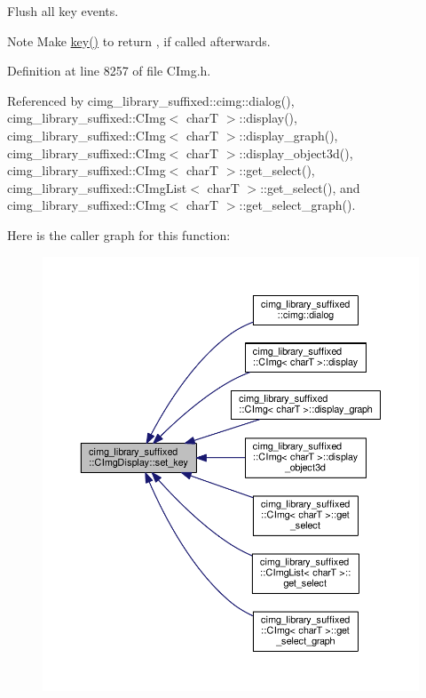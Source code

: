 Flush all key events. 

\begin{DoxyNote}{Note}
Make \hyperlink{structcimg__library__suffixed_1_1CImgDisplay_a8eb7cd4bd6e6593689f82d157caf3ec1}{key()} to return {}, if called afterwards. 
\end{DoxyNote}


Definition at line 8257 of file C\+Img.\+h.



Referenced by cimg\+\_\+library\+\_\+suffixed\+::cimg\+::dialog(), cimg\+\_\+library\+\_\+suffixed\+::\+C\+Img$<$ char\+T $>$\+::display(), cimg\+\_\+library\+\_\+suffixed\+::\+C\+Img$<$ char\+T $>$\+::display\+\_\+graph(), cimg\+\_\+library\+\_\+suffixed\+::\+C\+Img$<$ char\+T $>$\+::display\+\_\+object3d(), cimg\+\_\+library\+\_\+suffixed\+::\+C\+Img$<$ char\+T $>$\+::get\+\_\+select(), cimg\+\_\+library\+\_\+suffixed\+::\+C\+Img\+List$<$ char\+T $>$\+::get\+\_\+select(), and cimg\+\_\+library\+\_\+suffixed\+::\+C\+Img$<$ char\+T $>$\+::get\+\_\+select\+\_\+graph().

Here is the caller graph for this function\+:
\nopagebreak
\begin{figure}[H]
\begin{center}
\leavevmode
\includegraphics[width=350pt]{d5/d53/structcimg__library__suffixed_1_1CImgDisplay_a23693d0cc3adc326739bafdc0f3ad3ed_icgraph}
\end{center}
\end{figure}
\mbox{\label{structcimg__library__suffixed_1_1CImgDisplay_aaa2fe604fb2e3e2c3ab01b040fda6960}} 
